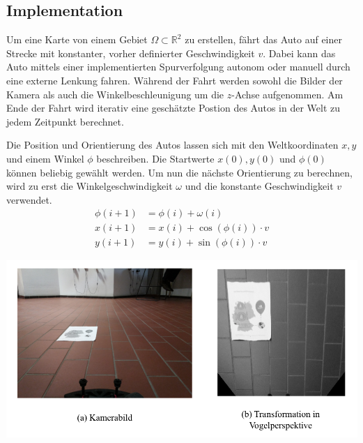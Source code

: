 \subsection{Implementation}

Um eine Karte von einem Gebiet $ \Omega \subset \mathbb{R}^2$ zu erstellen, fährt das Auto auf einer Strecke mit konstanter, vorher definierter Geschwindigkeit $v$. Dabei kann das Auto mittels einer implementierten Spurverfolgung autonom oder manuell durch eine externe Lenkung fahren. 
Während der Fahrt werden sowohl die Bilder der Kamera 
als auch die Winkelbeschleunigung um die $z$-Achse 
aufgenommen. Am Ende der Fahrt wird iterativ eine geschätzte Postion des Autos in der Welt zu jedem Zeitpunkt berechnet.

Die Position und Orientierung des Autos lassen sich mit den Weltkoordinaten $x,y$ und einem Winkel $\phi$ beschreiben. Die Startwerte $x(0),y(0)$ und $\phi(0)$ können beliebig gewählt werden. Um nun die nächste Orientierung zu berechnen, wird zu erst die Winkelgeschwindigkeit $\omega$ und die konstante Geschwindigkeit $v$ verwendet.
$$
\begin{aligned}
\phi(i+1)&=\phi(i)+\omega(i)\\
x(i+1)&=x(i)+\cos(\phi(i))\cdot v\\
y(i+1)&=y(i)+\sin(\phi(i))\cdot v
\end{aligned}
$$

\hspace{-12mm}
\includegraphics[scale=1]{vogel.png}


